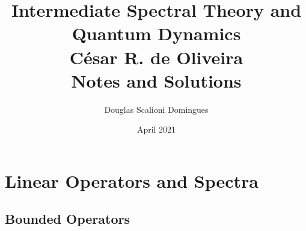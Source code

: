 \documentclass{article}
\theoremstyle{remark}
\begin{document}
\title{Intermediate Spectral Theory and Quantum Dynamics \\ César R. de Oliveira \\ Notes and Solutions}
\author{Douglas Scalioni Domingues}
\date{April 2021}

\maketitle

\section{Linear Operators and Spectra}

\subsection{Bounded Operators}
\end{document}
